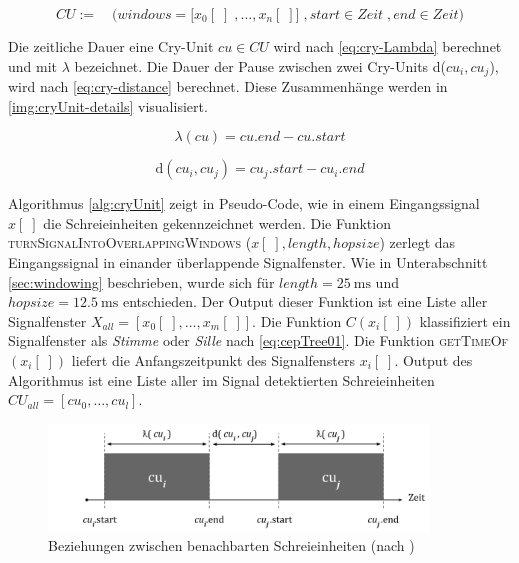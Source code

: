 \begin{equation}
CU := \quad \Big(windows = \big[x_0[\;] \; ,\ldots, x_n[\;] \big] \;, start \in Zeit \;, end \in Zeit \Big)
\label{eq:cry-Unit}
\end{equation}

Die zeitliche Dauer eine Cry-Unit $cu \in CU$ wird nach \autoref{eq:cry-Lambda} berechnet und mit $\lambda$ bezeichnet. Die Dauer der Pause zwischen zwei Cry-Units d($cu_i, cu_j$), wird nach \autoref{eq:cry-distance} berechnet. Diese Zusammenhänge werden in \autoref{img:cryUnit-details} visualisiert.\cite[S. 2]{vad_entropy}

\begin{equation}
\lambda (cu) = cu.end - cu.start
\label{eq:cry-Lambda}
\end{equation}

\begin{equation}
\text{d}(cu_i, cu_j) = cu_j.start - cu_i.end
\label{eq:cry-distance}
\end{equation}

Algorithmus \autoref{alg:cryUnit} zeigt in Pseudo-Code, wie in einem Eingangssignal $x[\;]$ die Schreieinheiten   gekennzeichnet werden. Die Funktion \textsc{turnSignalIntoOverlappingWindows} \linebreak ($x[\;], length, hopsize$) zerlegt das Eingangssignal in einander überlappende Signalfenster. Wie in Unterabschnitt \ref{sec:windowing} beschrieben, wurde sich für $length = \SI{25}{\milli\second}$ und $hopsize = \SI{12.5}{\milli\second}$ entschieden. Der Output dieser Funktion ist eine Liste aller Signalfenster $X_{all} = [x_0[\;] ,\ldots, x_m[\;]]$. Die Funktion $C(x_i[\;])$ klassifiziert ein Signalfenster als \emph{Stimme} oder \emph{Sille} nach \autoref{eq:cepTree01}. Die Funktion \textsc{getTimeOf}$(x_i[\;])$ liefert die Anfangszeitpunkt des Signalfensters $x_i[\;]$. Output des Algorithmus ist eine Liste aller im Signal detektierten Schreieinheiten $CU_{all} = [cu_0 , \ldots, cu_l]$. 

\begin{figure}[H]
	\centering
	\includegraphics[width=0.9\textwidth]{bilder/newSmoothing05.png}
	\caption[Beziehungen zwischen benachbarten Schreieinheiten]{Beziehungen zwischen benachbarten Schreieinheiten (nach \cite[S. 2]{vad_entropy})}
	\label{img:cryUnit-details}
\end{figure}


